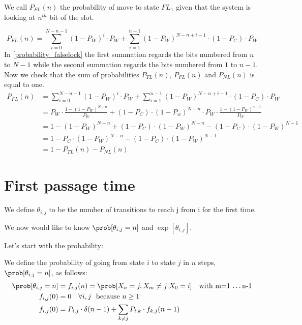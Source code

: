 We call $P_{FL}(n)$ the probability of move to state $FL_1$ given that the system is looking at $n^{th}$ bit of the slot.

\begin{equation}
	P_{FL}(n) = \sum_{i=0}^{N-n-1} (1-P_W)^{i} \cdot P_W + \sum_{i=1}^{n-1} (1-P_W)^{N-n+i-1} \cdot (1-P_C) \cdot P_W
	\label{probability_falselock}
\end{equation}
In \eqref{probability_falselock} the first summation regards the bits numbered from $n$ to $N-1$ while the second summation regards the bits numbered from $1$ to $n-1$.
Now we check that the sum of probabilities $P_{TL}(n)$, $P_{FL}(n)$ and $P_{NL}(n)$ is equal to one.
\begin{equation}
	\begin{split}
		P_{FL}(n) & = \sum_{i=0}^{N-n-1} (1-P_W)^{i} \cdot P_W + \sum_{i=1}^{n-1} (1-P_W)^{N-n+i-1} \cdot (1-P_C) \cdot P_W \\
		& = P_W \cdot \frac{1-(1-P_W)^{N-n}}{P_W} + (1-P_C) \cdot (1-P_w)^{N-n} \cdot P_W \cdot \frac{1-(1-P_W)^{n-1}}{P_W} \\
		& = 1 - (1-P_W)^{N-n} + (1-P_C) \cdot (1-P_W)^{N-n} - (1-P_C) \cdot (1-P_W)^{N-1} \\
		& = 1 - P_C \cdot (1-P_W)^{N-n} - (1-P_C) \cdot (1-P_W)^{N-1} \\
		& = 1 - P_{TL}(n) - P_{NL}(n)
	\end{split}
\end{equation}

\section{First passage time}
\begin{definition}[$\theta_{i,j}$]
We define $\theta_{i,j}$ to be the number of transitions to reach j from i for the first time.
\end{definition}
We now would like to know $\prob[\theta_{i,j}=n]$ and $\exp[\theta_{i,j}]$.

Let's start with the probability:
\begin{definition}
	We define the probability of going from state $i$ to state $j$ in $n$ steps, $\prob[\theta_{i,j}=n]$, as follows:
	\begin{equation}\begin{split}
		\prob[\theta_{i,j}=n] &= f_{i,j}(n)=\prob[X_n=j,X_m \neq j | X_0 = i] \quad \text{with m=1 \dots n-1}\\
		f_{i,j}(0)&=0 \quad \forall i,j \,\, \text{ because $n \ge 1$}\\
		f_{i,j}(0)&=P_{i,j} \cdot \delta(n-1) + \sum\limits_{k \neq j} P_{i,k} \cdot f_{k,j}(n-1)\\
	\end{split}\end{equation}
\end{definition}
